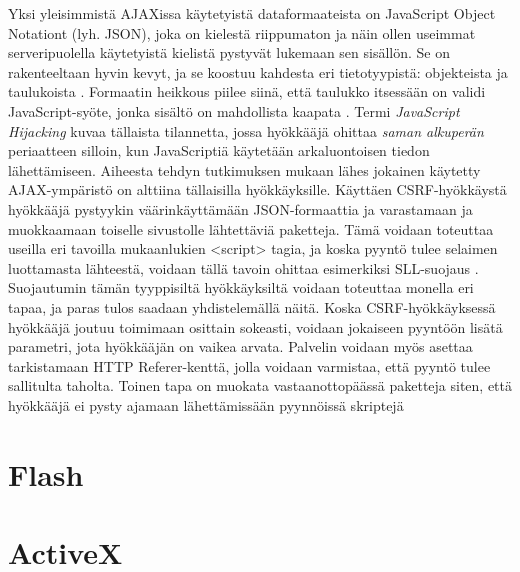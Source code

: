 Yksi yleisimmistä AJAXissa käytetyistä dataformaateista on JavaScript Object Notationt (lyh. JSON), joka on kielestä riippumaton ja näin ollen useimmat serveripuolella käytetyistä kielistä 
pystyvät lukemaan sen sisällön. Se on rakenteeltaan hyvin kevyt, ja se koostuu kahdesta eri tietotyypistä: objekteista ja taulukoista \cite{JSON}. Formaatin heikkous piilee siinä, että 
taulukko itsessään on validi JavaScript-syöte, jonka sisältö on mahdollista kaapata \cite{AJAX}. Termi \emph{JavaScript Hijacking} kuvaa tällaista tilannetta, jossa hyökkääjä ohittaa 
\emph{saman alkuperän} periaatteen silloin, kun JavaScriptiä käytetään arkaluontoisen tiedon lähettämiseen. Aiheesta tehdyn tutkimuksen \cite{JSH} mukaan lähes jokainen käytetty AJAX-ympäristö
on alttiina tällaisilla hyökkäyksille. Käyttäen CSRF-hyökkäystä hyökkääjä pystyykin väärinkäyttämään JSON-formaattia ja varastamaan ja muokkaamaan toiselle sivustolle lähtettäviä paketteja. 
Tämä voidaan toteuttaa useilla eri tavoilla mukaanlukien <script> tagia, ja koska pyyntö tulee selaimen luottamasta lähteestä, voidaan tällä tavoin ohittaa esimerkiksi SLL-suojaus \cite{AJAX}.
Suojautumin tämän tyyppisiltä hyökkäyksiltä voidaan toteuttaa monella eri tapaa, ja paras tulos saadaan yhdistelemällä näitä. Koska CSRF-hyökkäyksessä hyökkääjä joutuu toimimaan osittain 
sokeasti, voidaan jokaiseen pyyntöön lisätä parametri, jota hyökkääjän on vaikea arvata. Palvelin voidaan myös asettaa tarkistamaan HTTP Referer-kenttä, jolla voidaan varmistaa, että pyyntö
tulee sallitulta taholta. Toinen tapa on muokata vastaanottopäässä paketteja siten, että hyökkääjä ei pysty ajamaan lähettämissään pyynnöissä skriptejä \cite{JSH}

\section{Flash}

\section{ActiveX}

